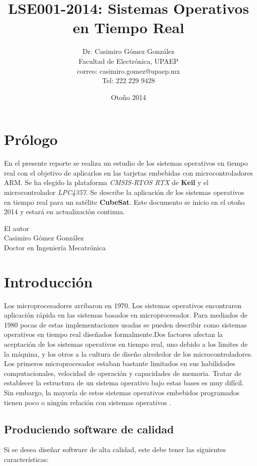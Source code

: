 \documentclass[12pt, twoside]{report}
\title{LSE001-2014: Sistemas Operativos en Tiempo Real}
\author{Dr. Casimiro Gómez González\\
	Facultad de Electrónica, UPAEP\\
               correo: casimiro.gomez@upaep.mx\\
               Tel: 222 229 9428}
\date{Otoño 2014}
\begin{document}
\maketitle

\chapter*{Prólogo}

En el presente reporte se realiza un estudio de los sistemas operativos en tiempo real con el objetivo de aplicarlos en las tarjetas embebidas con microcontroladores ARM. Se ha elegido la plataforma \textit{CMSIS-RTOS RTX} de \textbf{Keil} y el microcontrolador \textit{LPC4357}. Se describe la aplicación de los sistemas operativos en tiempo real para un satélite \textbf{CubeSat}. Este documento se inicio en el otoño 2014 y estará en actualización continua.


\begin{flushright}
	
	El autor\\
	Casimiro Gómez González\\
	Doctor en Ingeniería Mecatrónica
\end{flushright}

\tableofcontents


\chapter{Introducción}

Los microprocesadores arribaron en 1970. Los sistemas operativos encontraron aplicación rápida en las sistemas basados en microprocesador. Para mediados de 1980 pocas de estas implementaciones usadas se pueden describir como sistemas operativos en tiempo real diseñados formalmente.Dos factores afectan la aceptación de los sistemas operativos en tiempo real, uno debido a los limites de la máquina, y los otros a la cultura de diseño alrededor de los microcontroladores. Los primeros microprocesador estaban bastante limitados en sus habilidades computacionales, velocidad de operación y capacidades de memoria. Tratar de establecer la estructura de un sistema operativo bajo estas bases es muy difícil. Sin embargo, la mayoría de estos sistemas operativos embebidos programados tienen poco o ningún relación con sistemas operativos \cite{Cooling2014}.

\section{Produciendo software de calidad}
Si se desea diseñar software de alta calidad, este debe tener las siguientes características:
\end{document}
